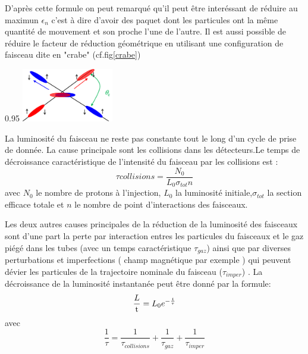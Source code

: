 D'après cette formule on peut remarqué qu'il peut être interéssant de réduire au maximun $\epsilon_{n}$ c'est à dire d'avoir des paquet dont les particules ont la même quantité de mouvement et son proche l'une de l'autre. Il est aussi possible de réduire le facteur de réduction géométrique en utilisant une configuration de faisceau dite en "crabe" (cf.fig\ref{crabe})

\begin{minipagewithmarginpars}[h]{0.95\textwidth}
\centering
\includegraphics[width=0.3\textwidth]{LHC/crab.png}
\label{crabe}	
\end{minipagewithmarginpars}

La luminosité du faisceau ne reste pas constante tout le long d'un cycle de prise de donnée. La cause principale sont les collisions dans les détecteurs.Le temps de décroissance caractéristique de l'intensité du faisceau par les collisions est :
\begin{equation}
\tau{collisions}=\frac{N_{0}}{L_{0}\sigma_{tot}n}
\end{equation}
avec $N_{0}$ le nombre de protons à l'injection, $L_{0}$ la luminosité initiale,$\sigma_{tot}$ la section efficace totale et $n$ le nombre de point d'interactions des faisceaux.

Les deux autres causes principales de la réduction de la luminosité des faisceaux sont d'une part la perte par interaction entres les particules du faisceaux et le gaz piégé dans les tubes (avec un temps caractéristique $\tau_{gaz}$) ainsi que par diverses perturbations et imperfections ( champ magnétique par exemple ) qui peuvent dévier les particules de la trajectoire nominale du faisceau ($\tau_{imper}$) . 
La décroissance de la luminosité instantanée peut être donné par la formule:
\begin{equation}
\frac{\mathrm \mathcal{L}}{\mathrm t} = L_{0} e^{-\frac{t}{\tau}}
\end{equation}
avec
\begin{equation}
\frac{1}{\tau} = \frac{1}{\tau_{collisions}}+\frac{1}{\tau_{gaz}}+\frac{1}{\tau_{imper}}
\end{equation}

